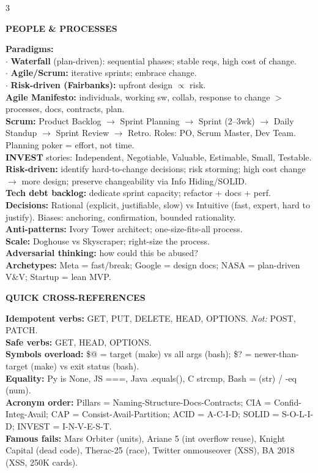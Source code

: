 \documentclass[10pt,letterpaper]{article}
\newenvironment{topic}[1]{%
  \par\addvspace{1.5pt}%
  \noindent\colorbox{hdrBG}{%
    \begin{minipage}{\dimexpr\linewidth-2\fboxsep\relax}%
      \centering\bfseries\sffamily\fontsize{6pt}{7pt}\selectfont\color{hdrFG}\MakeUppercase{#1}%
    \end{minipage}%
  }\par\nobreak\vskip0.5pt%
  \begingroup\setlength{\leftskip}{0pt}\setlength{\rightskip}{0pt}%
}{%
  \endgroup\par\addvspace{0.5pt}%
}
\newcommand{\hd}[1]{\textcolor{accent}{\textbf{#1}}}
\newcommand{\cn}[1]{{\ttfamily\small #1}}
\begin{document}
\begin{multicols*}{3}
\begin{topic}{People \& Processes}
\hd{Paradigms:}\\
$\cdot$ \textbf{Waterfall} (plan-driven): sequential phases; stable reqs, high cost of change.\\
$\cdot$ \textbf{Agile/Scrum:} iterative sprints; embrace change.\\
$\cdot$ \textbf{Risk-driven (Fairbanks):} upfront design $\propto$ risk.\\
\hd{Agile Manifesto:} individuals, working sw, collab, response to change $>$ processes, docs, contracts, plan.\\
\hd{Scrum:} Product Backlog $\to$ Sprint Planning $\to$ Sprint (2--3wk) $\to$ Daily Standup $\to$ Sprint Review $\to$ Retro. Roles: PO, Scrum Master, Dev Team. Planning poker = effort, not time.\\
\hd{INVEST} stories: Independent, Negotiable, Valuable, Estimable, Small, Testable.\\
\hd{Risk-driven:} identify hard-to-change decisions; risk storming; high cost change $\to$ more design; preserve changeability via Info Hiding/SOLID.\\
\hd{Tech debt backlog:} dedicate sprint capacity; refactor + docs + perf.\\
\hd{Decisions:} Rational (explicit, justifiable, slow) vs Intuitive (fast, expert, hard to justify). Biases: anchoring, confirmation, bounded rationality.\\
\hd{Anti-patterns:} Ivory Tower architect; one-size-fits-all process.\\
\hd{Scale:} Doghouse vs Skyscraper; right-size the process.\\
\hd{Adversarial thinking:} how could this be abused?\\
\hd{Archetypes:} Meta = fast/break; Google = design docs; NASA = plan-driven V\&V; Startup = lean MVP.
\end{topic}

\begin{topic}{Quick Cross-References}
\hd{Idempotent verbs:} GET, PUT, DELETE, HEAD, OPTIONS. \emph{Not:} POST, PATCH.\\
\hd{Safe verbs:} GET, HEAD, OPTIONS.\\
\hd{Symbols overload:} \cn{\$@} = target (make) vs all args (bash); \cn{\$?} = newer-than-target (make) vs exit status (bash).\\
\hd{Equality:} Py \cn{is None}, JS \cn{===}, Java \cn{.equals()}, C \cn{strcmp}, Bash \cn{=} (str) / \cn{-eq} (num).\\
\hd{Acronym order:} Pillars = Naming-Structure-Docs-Contracts; CIA = Confid-Integ-Avail; CAP = Consist-Avail-Partition; ACID = A-C-I-D; SOLID = S-O-L-I-D; INVEST = I-N-V-E-S-T.\\
\hd{Famous fails:} Mars Orbiter (units), Ariane 5 (int overflow reuse), Knight Capital (dead code), Therac-25 (race), Twitter onmouseover (XSS), BA 2018 (XSS, 250K cards).
\end{topic}

\end{multicols*}
\end{document}
